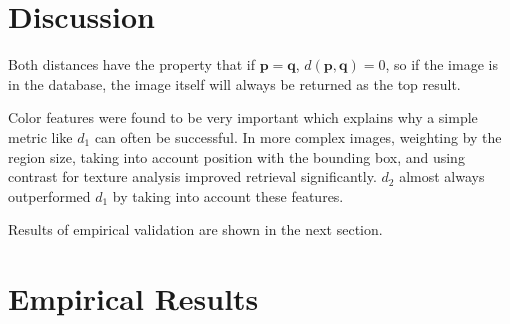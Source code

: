 \documentclass[letterpaper]{article}
\begin{document}
\section{Discussion}

Both distances have the property that if $\mathbf{p} = \mathbf{q}$,
$d\left(\mathbf{p}, \mathbf{q}\right) = 0$, so if the image is in the
database, the image itself will always be returned as the top result.

Color features were found to be very important which explains why a simple
metric like $d_1$ can often be successful. In more complex images, weighting by
the region size, taking into account position with the bounding box, and using
contrast for texture analysis improved retrieval significantly. $d_2$ almost
always outperformed $d_1$ by taking into account these features.

Results of empirical validation are shown in the next section.

\section{Empirical Results}
\end{document}
